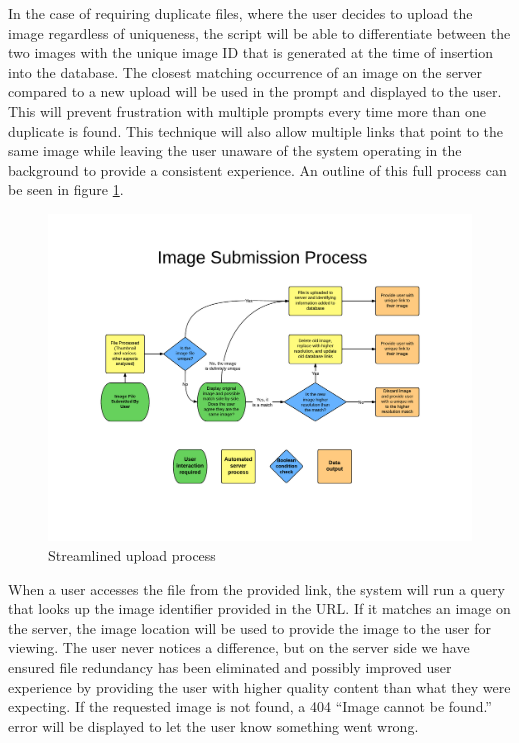 In the case of requiring duplicate files, where the user decides to upload the image regardless of uniqueness, the script will be able to differentiate between the two images with the unique image ID that is generated at the time of insertion into the database. The closest matching occurrence of an image on the server compared to a new upload will be used in the prompt and displayed to the user. This will prevent frustration with multiple prompts every time more than one duplicate is found. This technique will also allow multiple links that point to the same image while leaving the user unaware of the system operating in the background to provide a consistent experience. An outline of this full process can be seen in figure \ref{method-fig1}.

\begin{figure}[htbp]
\centering
\includegraphics[trim={3cm 3.5cm 2cm 4.2cm},clip, width=6in]{upproc}
\caption{Streamlined upload process}
\label{method-fig1}
\end{figure}

When a user accesses the file from the provided link, the system will run a query that looks up the image identifier provided in the URL. If it matches an image on the server, the image location will be used to provide the image to the user for viewing. The user never notices a difference, but on the server side we have ensured file redundancy has been eliminated and possibly improved user experience by providing the user with higher quality content than what they were expecting. If the requested image is not found, a 404 ``Image cannot be found.'' error will be displayed to let the user know something went wrong.

